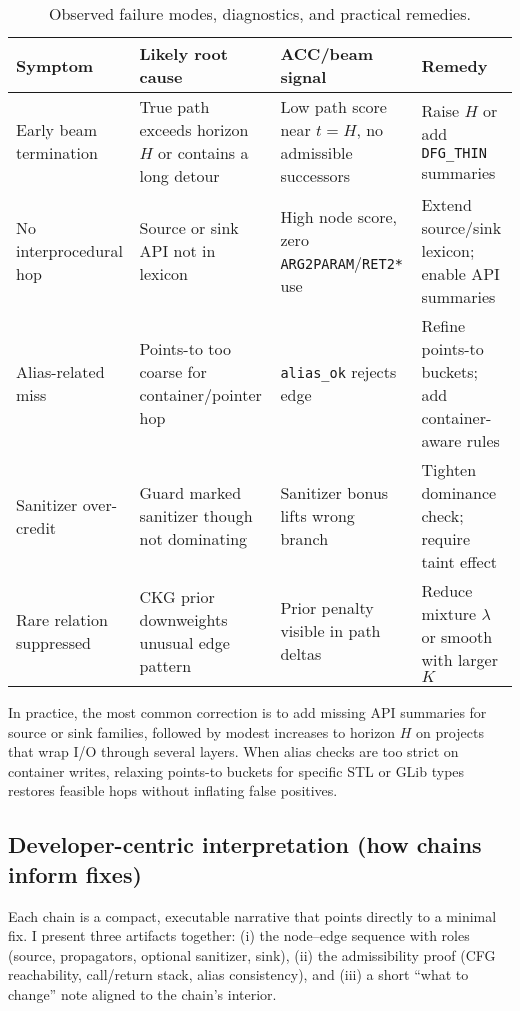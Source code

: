 \documentclass{buthesis}
\begin{document}
\begin{table}[H]
\centering
\footnotesize
\setlength{\tabcolsep}{2pt}
\renewcommand{\arraystretch}{1.12}
\caption{Observed failure modes, diagnostics, and practical remedies.}
\label{tab:qual-fail}
\begin{tabularx}{\linewidth}{Y Y Y Y}
\toprule
\textbf{Symptom} & \textbf{Likely root cause} & \textbf{ACC/beam signal} & \textbf{Remedy} \\
\midrule
Early beam termination &
True path exceeds horizon $H$ or contains a long detour &
Low path score near $t{=}H$, no admissible successors &
Raise $H$ or add \texttt{DFG\_THIN} summaries \\

No interprocedural hop &
Source or sink API not in lexicon &
High node score, zero \texttt{ARG2PARAM}/\texttt{RET2*} use &
Extend source/sink lexicon; enable API summaries \\

Alias-related miss &
Points-to too coarse for container/pointer hop &
\texttt{alias\_ok} rejects edge &
Refine points-to buckets; add container-aware rules \\

Sanitizer over-credit &
Guard marked sanitizer though not dominating &
Sanitizer bonus lifts wrong branch &
Tighten dominance check; require taint effect \\

Rare relation suppressed &
CKG prior downweights unusual edge pattern &
Prior penalty visible in path deltas &
Reduce mixture $\lambda$ or smooth with larger $K$ \\
\bottomrule
\end{tabularx}
\end{table}

In practice, the most common correction is to add missing API summaries for source or sink families, followed by modest increases to horizon $H$ on projects that wrap I/O through several layers. When alias checks are too strict on container writes, relaxing points-to buckets for specific STL or GLib types restores feasible hops without inflating false positives.

\subsection{Developer-centric interpretation (how chains inform fixes)}
\label{subsec:qual-dev}

Each chain is a compact, executable narrative that points directly to a minimal fix. I present three artifacts together: (i) the node–edge sequence with roles (source, propagators, optional sanitizer, sink), (ii) the admissibility proof (CFG reachability, call/return stack, alias consistency), and (iii) a short “what to change” note aligned to the chain’s interior.
\end{document}
